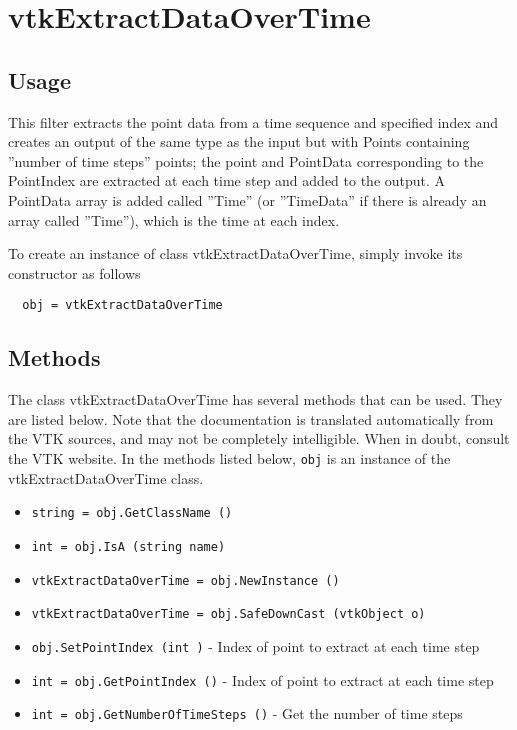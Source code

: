 \section{vtkExtractDataOverTime}

\subsection{Usage}

 This filter extracts the point data from a time sequence and specified index
 and creates an output of the same type as the input but with Points 
 containing ''number of time steps'' points; the point and PointData 
 corresponding to the PointIndex are extracted at each time step and added to
 the output.  A PointData array is added called ''Time'' (or ''TimeData'' if
 there is already an array called ''Time''), which is the time at each index.

To create an instance of class vtkExtractDataOverTime, simply
invoke its constructor as follows
\begin{verbatim}
  obj = vtkExtractDataOverTime
\end{verbatim}
\subsection{Methods}

The class vtkExtractDataOverTime has several methods that can be used.
  They are listed below.
Note that the documentation is translated automatically from the VTK sources,
and may not be completely intelligible.  When in doubt, consult the VTK website.
In the methods listed below, \verb|obj| is an instance of the vtkExtractDataOverTime class.
\begin{itemize}
\item  \verb|string = obj.GetClassName ()|

\item  \verb|int = obj.IsA (string name)|

\item  \verb|vtkExtractDataOverTime = obj.NewInstance ()|

\item  \verb|vtkExtractDataOverTime = obj.SafeDownCast (vtkObject o)|

\item  \verb|obj.SetPointIndex (int )| -  Index of point to extract at each time step

\item  \verb|int = obj.GetPointIndex ()| -  Index of point to extract at each time step

\item  \verb|int = obj.GetNumberOfTimeSteps ()| -  Get the number of time steps

\end{itemize}
